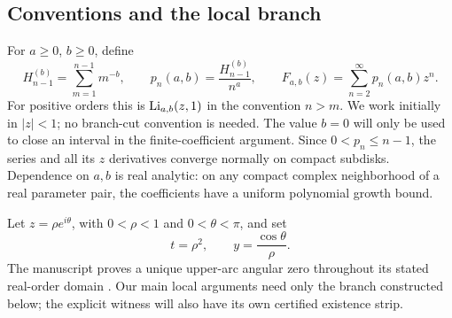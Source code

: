 \subsection{Conventions and the local branch}
For $a\ge0$, $b\ge0$, define
\begin{equation}
 H_{n-1}^{(b)}=\sum_{m=1}^{n-1}m^{-b},\qquad
 p_n(a,b)=\frac{H_{n-1}^{(b)}}{n^a},\qquad
 F_{a,b}(z)=\sum_{n=2}^{\infty}p_n(a,b)z^n.
 \label{rbif:eq:def}
\end{equation}
For positive orders this is $\operatorname{Li}_{a,b}(z,1)$ in the convention
$n>m$. We work initially in $|z|<1$; no branch-cut convention is needed.
The value $b=0$ will only be used to close an interval in the
finite-coefficient argument. Since $0<p_n\le n-1$, the series and all
its $z$ derivatives converge normally on compact subdisks. Dependence on
$a,b$ is real analytic: on any compact complex neighborhood of a real
parameter pair, the coefficients have a uniform polynomial growth bound.

Let $z=\rho e^{i\theta}$, with $0<\rho<1$ and $0<\theta<\pi$, and set
\begin{equation}
 t=\rho^2,\qquad y=\frac{\cos\theta}{\rho}.
 \label{rbif:eq:ty}
\end{equation}
The manuscript proves a unique upper-arc angular zero throughout its
stated real-order domain \cite{rbif:cartesian}. Our main local arguments
need only the branch constructed below; the explicit witness will also
have its own certified existence strip.

